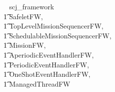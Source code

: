 \begin{zsection}
  \SECTION ~ scj\_framework ~ \parents\\
  \t1 SafeletFW,\\
  \t1 TopLevelMissionSequencerFW,\\
  \t1 SchedulableMissionSequencerFW, \\
  \t1 MissionFW,\\
  \t1 AperiodicEventHandlerFW,\\
  \t1 PeriodicEventHandlerFW, \\
  \t1 OneShotEventHandlerFW, \\
  \t1 ManagedThreadFW
\end{zsection}
